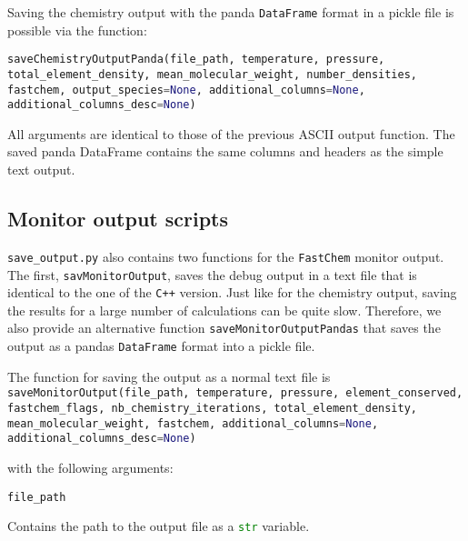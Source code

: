 \documentclass[numbers=noenddot]{aux/fcmanual}
\newcommand{\fc}{\texttt{FastChem}\xspace}
\newcommand{\cpp}{\ttt{C++}\xspace}
\newcommand{\ttt}[1]{\texttt {#1}}
\begin{document}
Saving the chemistry output with the panda \lstinline[language=Python]!DataFrame! format in a pickle file is possible via the function:

\bigbreak

\lstinline[language=Python, breaklines, breakatwhitespace]!saveChemistryOutputPanda(file_path, temperature, pressure, total_element_density, mean_molecular_weight, number_densities, fastchem, output_species=None, additional_columns=None, additional_columns_desc=None)!

\bigbreak

All arguments are identical to those of the previous ASCII output function. The saved panda DataFrame contains the same columns and headers as the simple text output.


\subsection{Monitor output scripts}

\texttt{save\_output.py} also contains two functions for the \fc monitor output. The first, \lstinline[language=Python]!savMonitorOutput!, saves the debug output in a text file that is identical to the one of the \cpp version. Just like for the chemistry output, saving the results for a large number of calculations can be quite slow. Therefore, we also provide an alternative function \lstinline[language=Python]!saveMonitorOutputPandas! that saves the output as a pandas \lstinline[language=Python]!DataFrame! format into a pickle file. 

The function for saving the output as a normal text file is\\

\lstinline[language=Python, breaklines, breakatwhitespace]!saveMonitorOutput(file_path, temperature, pressure, element_conserved, fastchem_flags, nb_chemistry_iterations, total_element_density, mean_molecular_weight, fastchem, additional_columns=None, additional_columns_desc=None)!

\bigbreak

with the following arguments:

\bigbreak

\lstinline[language=Python]!file_path!
\begin{addmargin}[25pt]{0pt}
	Contains the path to the output file as a \lstinline[language=Python]!str! variable.
\end{addmargin}


\bigbreak
\end{document}
